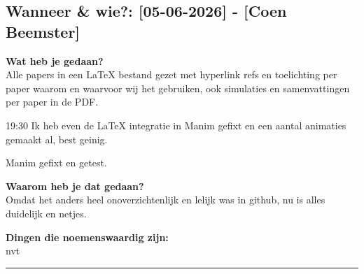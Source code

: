 
\subsection*{Wanneer \& wie?: [05-06-2026] - [Coen Beemster]}

\textbf{Wat heb je gedaan?}\\
Alle papers in een LaTeX bestand gezet met hyperlink refs en toelichting per paper waarom en waarvoor wij het gebruiken, ook simulaties en samenvattingen per paper in de PDF.

19:30 Ik heb even de LaTeX integratie in Manim gefixt en een aantal animaties gemaakt al, best geinig.

Manim gefixt en getest.
\vspace{0.3cm} 

\noindent \textbf{Waarom heb je dat gedaan?}\\
Omdat het anders heel onoverzichtenlijk en lelijk was in github, nu is alles duidelijk en netjes.

\noindent \textbf{Dingen die noemenswaardig zijn:}\\
nvt


\vspace{0.5cm}
\hrule 
\vspace{0.5cm}
